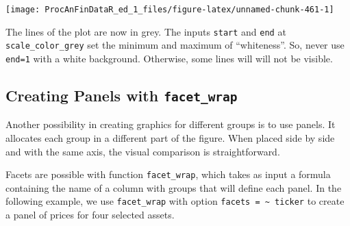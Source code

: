 \documentclass[11pt,]{book}
\newenvironment{Shaded}{\begin{snugshade}}{\end{snugshade}}
\newcommand{\KeywordTok}[1]{\textcolor[rgb]{0.27,0.27,0.27}{\textbf{#1}}}
\newcommand{\DataTypeTok}[1]{\textcolor[rgb]{0.27,0.27,0.27}{#1}}
\newcommand{\DecValTok}[1]{\textcolor[rgb]{0.06,0.06,0.06}{#1}}
\newcommand{\StringTok}[1]{\textcolor[rgb]{0.5,0.5,0.5}{#1}}
\newcommand{\CommentTok}[1]{\textcolor[rgb]{0.56,0.35,0.01}{\textit{#1}}}
\newcommand{\OperatorTok}[1]{\textcolor[rgb]{0.81,0.36,0.00}{\textbf{#1}}}
\newcommand{\NormalTok}[1]{#1}
\begin{document}
\begin{center}\texttt{[image: ProcAnFinDataR\_ed\_1\_files/figure-latex/unnamed-chunk-461-1]} \end{center}

The lines of the plot are now in grey. The inputs \texttt{start} and
\texttt{end} at \texttt{scale\_color\_grey} set the minimum and maximum
of ``whiteness''. So, never use \texttt{end=1} with a white background.
Otherwise, some lines will will not be visible.

\subsection{\texorpdfstring{Creating Panels with
\texttt{facet\_wrap}}{Creating Panels with facet\_wrap}}\label{creating-panels-with-facet_wrap}

Another possibility in creating graphics for different groups is to use
panels. It allocates each group in a different part of the figure. When
placed side by side and with the same axis, the visual comparison is
straightforward.

Facets are possible with function \texttt{facet\_wrap}, which takes as
input a formula containing the name of a column with groups that will
define each panel. In the following example, we use \texttt{facet\_wrap}
with option \texttt{facets\ =\ \textasciitilde{}\ ticker} to create a
panel of prices for four selected assets. 

\begin{Shaded}
\end{Shaded}
\end{document}
